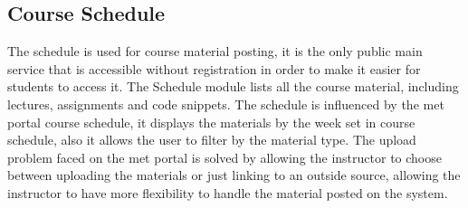 \subsection{Course Schedule}
\label{sub:schedule}
The schedule is used for course material posting, it is the only public main service that is accessible without registration in order to make
it easier for students to access it. The Schedule module lists all the course material, including lectures, assignments and code snippets. The schedule
is influenced by the \ac{met} portal course schedule, it displays the materials by the week set in course schedule, also it allows the user
to filter by the material type. The upload problem faced on the \ac{met} portal is solved by allowing the instructor to choose between uploading
the materials or just linking to an outside source, allowing the instructor to have more flexibility to handle the material posted on the system.
